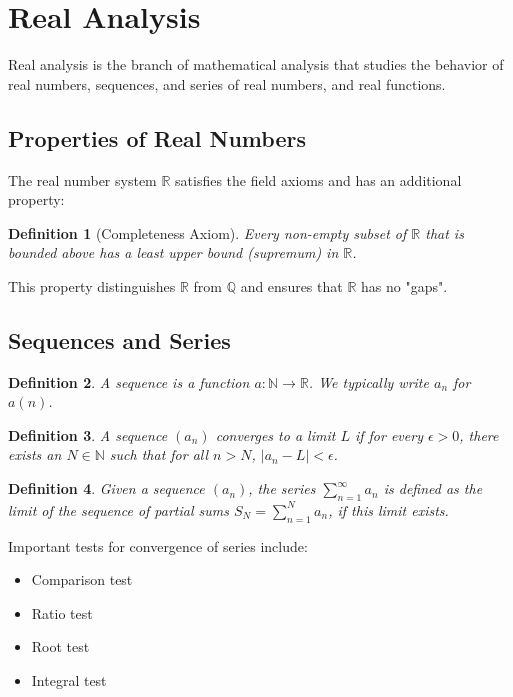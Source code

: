\documentclass[12pt,a4paper]{article}
\newtheorem{definition}{Definition}
\begin{document}
\section{Real Analysis}

Real analysis is the branch of mathematical analysis that studies the behavior of real numbers, sequences, and series of real numbers, and real functions.

\subsection{Properties of Real Numbers}

The real number system $\mathbb{R}$ satisfies the field axioms and has an additional property:

\begin{definition}[Completeness Axiom]
Every non-empty subset of $\mathbb{R}$ that is bounded above has a least upper bound (supremum) in $\mathbb{R}$.
\end{definition}

This property distinguishes $\mathbb{R}$ from $\mathbb{Q}$ and ensures that $\mathbb{R}$ has no "gaps".

\subsection{Sequences and Series}

\begin{definition}
A sequence is a function $a: \mathbb{N} \to \mathbb{R}$. We typically write $a_n$ for $a(n)$.
\end{definition}

\begin{definition}
A sequence $(a_n)$ converges to a limit $L$ if for every $\epsilon > 0$, there exists an $N \in \mathbb{N}$ such that for all $n > N$, $|a_n - L| < \epsilon$.
\end{definition}

\begin{definition}
Given a sequence $(a_n)$, the series $\sum_{n=1}^{\infty} a_n$ is defined as the limit of the sequence of partial sums $S_N = \sum_{n=1}^N a_n$, if this limit exists.
\end{definition}

Important tests for convergence of series include:
\begin{itemize}
    \item Comparison test
    \item Ratio test
    \item Root test
    \item Integral test
\end{itemize}
\end{document}
